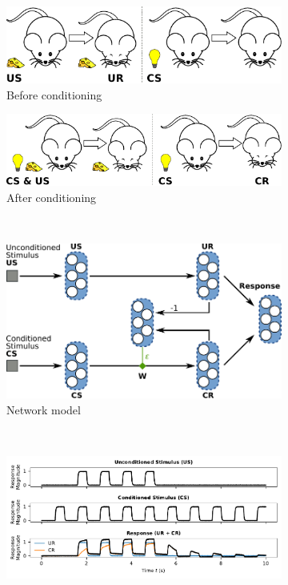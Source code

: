 \documentclass[10pt,letterpaper,oneside]{article}
\begin{document}
\begin{figure}[p]
	\centering%
	\begin{subfigure}{0.5\textwidth}%
		\centering%
		\includegraphics[scale=0.85]{media/classical_conditioning_a.pdf}%
		\caption{Before conditioning}%
		\label{fig:classical_conditioning_a}
	\end{subfigure}%
	\begin{subfigure}{0.5\textwidth}%
		\centering%
		\includegraphics[scale=0.85]{media/classical_conditioning_b.pdf}%
		\caption{After conditioning}%
		\label{fig:classical_conditioning_b}
	\end{subfigure}\\[0.5cm]
	\begin{subfigure}{\textwidth}%
		\centering%
		\includegraphics[scale=0.85]{media/conditioning_network.pdf}%
		\caption{Network model}
		\label{fig:conditioning_network}
	\end{subfigure}\\[0.5cm]
	\begin{subfigure}{\textwidth}
		\centering
		\includegraphics{media/classical_conditioning_experiment.pdf}

\end{subfigure}
\end{figure}
\end{document}
